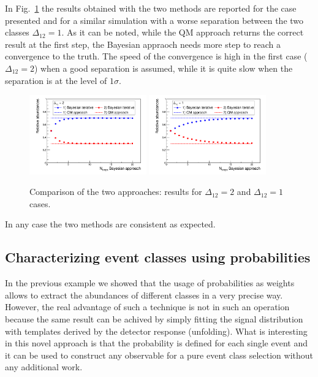 In Fig.~\ref{fig:IterGaus2} the results obtained with the two methods are
reported for the case presented and for a similar simulation with a worse
separation between the two classes $\Delta_{12} = 1$.
As it can be noted, while the QM approach returns the correct result at the
first step, the Bayesian appraoch needs more step to reach a convergence to
the truth. The speed of the convergence is high in the first case
($\Delta_{12} = 2$) when a good separation is assumed, while it is quite slow
when the separation is at the level of $1\sigma$.

\begin{figure}[!htb]
\centering
\includegraphics[width=0.45\textwidth]{../png/figIterativeDelta2.png}
\includegraphics[width=0.45\textwidth]{../png/figIterativeDelta1.png}
\caption{Comparison of the two approaches: results for $\Delta_{12} = 2$ and
  $\Delta_{12} = 1$ cases.}
\label{fig:IterGaus2}
\end{figure}

In any case the two methods are consistent as expected.

\subsection{Characterizing event classes using probabilities}
In the previous example we showed that the usage of probabilities as weights
allows to extract the abundances of different classes in a very precise way.
However, the real advantage of such a technique is not in such an operation
because the same result can be achived by simply fitting the signal
distribution with templates derived by the detector response (unfolding).
What is interesting in this novel approach is that the probability is defined
for each single event and it can be used to construct any observable for a
pure event class selection without any additional work.

